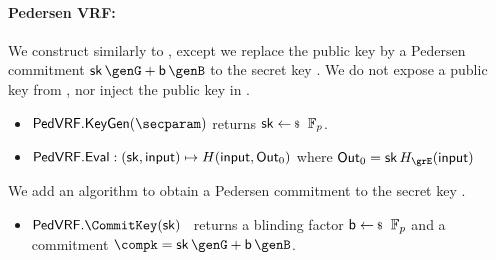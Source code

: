 \paragraph{Pedersen VRF:} 
We construct \PedVRF similarly to 
 \cite{nsec5,VXEd25519,draft-irtf-cfrg-vrf-10},
except we replace the public key by a Pedersen commitment
 $\sk \, \genG + \openpk \, \genB$ to the secret key \sk.
We do not expose a public key from \KeyGen, nor inject the public key in \Eval.
\begin{itemize}
    \item $\PedVRF.\KeyGen(\secparam)$  returns $\sk \leftsample \F_p$. %
    \item ${\mathsf{PedVRF}}.{\mathsf{Eval}} : (\mathsf{sk},\mathsf{input}) \mapsto H(\mathsf{input}, {\mathsf{Out}}_0)$ where $\PreOut = \sk \, H_{\grE}(\msg)$
\end{itemize}
\noindent We add an algorithm to obtain a Pedersen commitment to the secret key \sk.
\begin{itemize}
    \item $\PedVRF.\CommitKey(\sk)$ \,
    returns a blinding factor $\openpk \leftsample \F_p$
    and a commitment $\compk = \sk \, \genG + \openpk \, \genB$.
\end{itemize}

